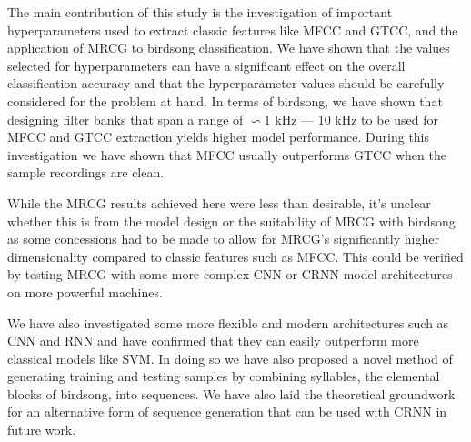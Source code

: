 The main contribution of this study is the investigation of important
hyperparameters used to extract classic features like MFCC and GTCC, and the
application of MRCG to birdsong classification. We have shown that the values
selected for hyperparameters can have a significant effect on the overall
classification accuracy and that the hyperparameter values should be carefully
considered for the problem at hand. In terms of birdsong, we have shown that
designing filter banks that span a range of $\backsim$1 kHz --- 10 kHz to be
used for MFCC and GTCC extraction yields higher model performance. During this
investigation we have shown that MFCC usually outperforms GTCC when the sample
recordings are clean.

While the MRCG results achieved here were less than desirable, it's unclear
whether this is from the model design or the suitability of MRCG with birdsong
as some concessions had to be made to allow for MRCG's significantly higher
dimensionality compared to classic features such as MFCC\@. This could be
verified by testing MRCG with some more complex CNN or CRNN model architectures
on more powerful machines.

We have also investigated some more flexible and modern architectures such as CNN
and RNN and have confirmed that they can easily outperform more classical models
like SVM\@. In doing so we have also proposed a novel method of generating
training and testing samples by combining syllables, the elemental blocks of
birdsong, into sequences. We have also laid the theoretical groundwork for an
alternative form of sequence generation that can be used with CRNN in future work.
